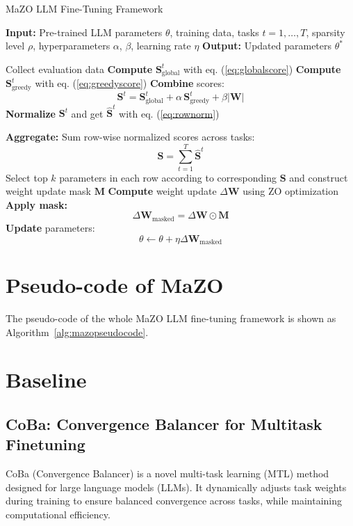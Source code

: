 \begin{algorithm}[t!]
\caption{MaZO LLM Fine-Tuning Framework}
\label{alg:mazopseudocode}
\begin{algorithmic}[t]
\State \textbf{Input:} 
     Pre-trained LLM parameters $\theta$, training data, tasks $t = 1, \dots, T$, 
     sparsity level $\rho$, hyperparameters $\alpha$, $\beta$, learning rate $\eta$
\State \textbf{Output:} Updated parameters $\theta^*$

    \State Collect evaluation data
    \State \textbf{Compute} $\mathbf{S}^t_{\text{global}}$ with eq. (\ref{eq:globalscore})
    \State \textbf{Compute} $\mathbf{S}^t_{\text{greedy}}$ with eq. (\ref{eq:greedyscore})
    \State \textbf{Combine} scores:
        \[
        \mathbf{S}^t = \mathbf{S}^t_{\text{global}} + \alpha\,\mathbf{S}^t_{\text{greedy}} + \beta|\mathbf{W}|
        \]
    \State \textbf{Normalize} $\mathbf{S}^t$ and get $\hat{\mathbf{S}}^t$ with eq. (\ref{eq:rownorm})
\EndFor

\State \textbf{Aggregate:} Sum row-wise normalized scores across tasks:
    \[
    \mathbf{S} = \sum_{t=1}^{T}\hat{\mathbf{S}}^t
    \]
    \State Select top $k$ parameters in each row according to corresponding $\mathbf{S}$ and construct weight update mask $\mathbf{M}$ 
\EndFor
\EndFor
{}
\State \textbf{Compute} weight update $\Delta \mathbf{W}$ using ZO optimization
\State \textbf{Apply mask:} 
    \[
    \Delta \mathbf{W}_{\text{masked}} = \Delta \mathbf{W} \odot \mathbf{M}
    \]
\State \textbf{Update} parameters: 
    \[
    \theta \leftarrow \theta + \eta \Delta \mathbf{W}_{\text{masked}}
    \]
\EndFor
\end{algorithmic}
\end{algorithm}

\section{Pseudo-code of MaZO}
\label{app:pseudocode}
The pseudo-code of the whole MaZO LLM fine-tuning framework is shown as Algorithm~\ref{alg:mazopseudocode}.

\section{Baseline}
\label{app:baseline}

\subsection{CoBa: Convergence Balancer for Multitask Finetuning}
CoBa (Convergence Balancer) \citep{gong2024coba} is a novel multi-task learning (MTL) method designed for large language models (LLMs). It dynamically adjusts task weights during training to ensure balanced convergence across tasks, while maintaining computational efficiency. 

